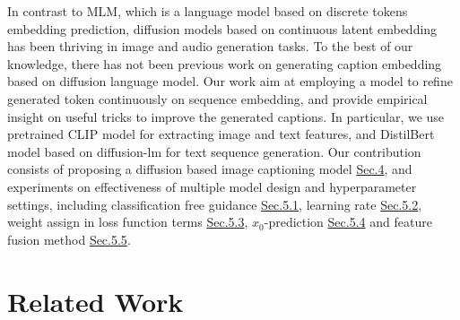\documentclass{article}
\begin{document}
In contrast to MLM, which is a language model based on discrete tokens embedding prediction, diffusion models based on continuous latent embedding has been thriving in image and audio generation tasks\cite{dalle2, https://doi.org/10.48550/arxiv.2205.11487,glide,DBLP:journals/corr/abs-2105-06337,https://doi.org/10.48550/arxiv.2207.09983}. To the best of our knowledge, there has not been previous work on generating caption embedding based on diffusion language model. Our work aim at employing a model to refine generated token continuously on sequence embedding, and provide empirical insight on useful tricks to improve the generated captions. In particular, we use pretrained CLIP\cite{clip} model for extracting image and text features, and DistilBert\cite{distilbert} model based on diffusion-lm\cite{diffuselm} for text sequence generation. Our contribution consists of proposing a diffusion based image captioning model \hyperref[sec:CLIP-DiffuseLM]{Sec.4}, and experiments on effectiveness of multiple model design and hyperparameter settings, including classification free guidance \hyperref[sec:classification-free-exp]{Sec.5.1}, learning rate \hyperref[sec:lr-exp]{Sec.5.2}, weight assign in loss function terms \hyperref[sec:lambda-exp]{Sec.5.3}, $x_0$-prediction \hyperref[sec:x0-exp]{Sec.5.4} and feature fusion method \hyperref[sec:CLIP-DiffuseLM]{Sec.5.5}.

\section{Related Work}
\label{sec:headings}
\end{document}
